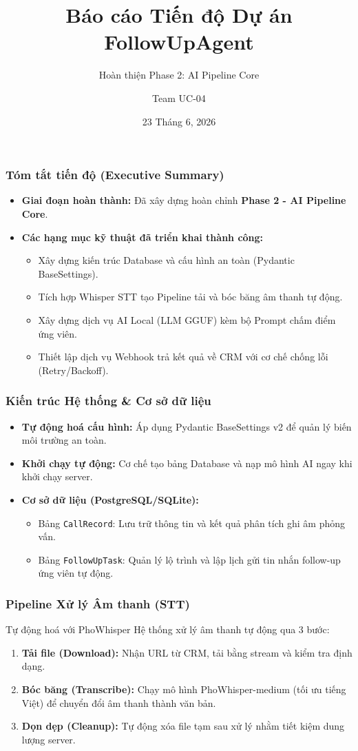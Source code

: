\documentclass{beamer}
\title[Tiến độ FollowUpAgent]{Báo cáo Tiến độ Dự án FollowUpAgent}
\subtitle{Hoàn thiện Phase 2: AI Pipeline Core}
\author[]{Team UC-04}
\institute{}
\date{23 Tháng 6, 2026}
\begin{document}
\frame{\titlepage}

\begin{frame}
\frametitle{Tóm tắt tiến độ (Executive Summary)}
\begin{itemize}
    \item \textbf{Giai đoạn hoàn thành:} Đã xây dựng hoàn chỉnh \textbf{Phase 2 - AI Pipeline Core}.
    \item \textbf{Các hạng mục kỹ thuật đã triển khai thành công:}
    \begin{itemize}
        \item Xây dựng kiến trúc Database và cấu hình an toàn (Pydantic BaseSettings).
        \item Tích hợp Whisper STT tạo Pipeline tải và bóc băng âm thanh tự động.
        \item Xây dựng dịch vụ AI Local (LLM GGUF) kèm bộ Prompt chấm điểm ứng viên.
        \item Thiết lập dịch vụ Webhook trả kết quả về CRM với cơ chế chống lỗi (Retry/Backoff).
    \end{itemize}
\end{itemize}
\end{frame}

\begin{frame}
\frametitle{Kiến trúc Hệ thống \& Cơ sở dữ liệu}
\begin{itemize}
    \item \textbf{Tự động hoá cấu hình:} Áp dụng Pydantic BaseSettings v2 để quản lý biến môi trường an toàn.
    \item \textbf{Khởi chạy tự động:} Cơ chế tạo bảng Database và nạp mô hình AI ngay khi khởi chạy server.
    \item \textbf{Cơ sở dữ liệu (PostgreSQL/SQLite):} 
    \begin{itemize}
        \item Bảng \texttt{CallRecord}: Lưu trữ thông tin và kết quả phân tích ghi âm phỏng vấn.
        \item Bảng \texttt{FollowUpTask}: Quản lý lộ trình và lập lịch gửi tin nhắn follow-up ứng viên tự động.
    \end{itemize}
\end{itemize}
\end{frame}

\begin{frame}
\frametitle{Pipeline Xử lý Âm thanh (STT)}
\begin{block}{Tự động hoá với PhoWhisper}
Hệ thống xử lý âm thanh tự động qua 3 bước:
\begin{enumerate}
    \item \textbf{Tải file (Download):} Nhận URL từ CRM, tải bằng stream và kiểm tra định dạng.
    \item \textbf{Bóc băng (Transcribe):} Chạy mô hình PhoWhisper-medium (tối ưu tiếng Việt) để chuyển đổi âm thanh thành văn bản.
    \item \textbf{Dọn dẹp (Cleanup):} Tự động xóa file tạm sau xử lý nhằm tiết kiệm dung lượng server.
\end{enumerate}
\end{block}
\end{frame}
\end{document}
